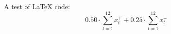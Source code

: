 A test of LaTeX code: \[ 0.50 \cdot \sum_{t = 1}^{12} x_t^+ + 0.25 \cdot \sum_{t = 1}^{12} x_t^- \] 